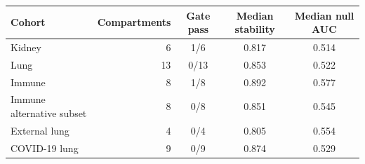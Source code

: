 \begin{tabular}{|l|r|c|c|c|}
\hline
\textbf{Cohort} & \textbf{Compartments} & \textbf{Gate pass} & \textbf{Median stability} & \textbf{Median null AUC} \\ \hline
Kidney & 6 & 1/6 & 0.817 & 0.514 \\ \hline
Lung & 13 & 0/13 & 0.853 & 0.522 \\ \hline
Immune & 8 & 1/8 & 0.892 & 0.577 \\ \hline
Immune alternative subset & 8 & 0/8 & 0.851 & 0.545 \\ \hline
External lung & 4 & 0/4 & 0.805 & 0.554 \\ \hline
COVID-19 lung & 9 & 0/9 & 0.874 & 0.529 \\ \hline
\end{tabular}
